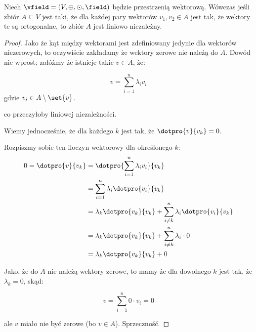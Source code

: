 \begin{theorem}
Niech \(\vfield = (V, \oplus, \odot, \field)\) będzie przestrzenią wektorową. Wówczas jeśli zbiór \( A \subseteq V\) jest taki, że dla każdej pary wektorów \(v_1, v_2 \in A\) jest tak, że wektory te są ortogonalne, to zbiór \(A\) jest liniowo niezależny.
\end{theorem}
\begin{proof} 
Jako że kąt między wektorami jest zdefiniowany jedynie dla wektorów niezerowych, to oczywiście zakładamy że wektory zerowe nie należą do \(A\).
Dowód nie wprost; załóżmy że istnieje takie \(v \in A\), że: 

\[ 
    v = \sum_{i=1}^{n} \lambda_i v_i
\]
gdzie \(v_i \in A \setminus \set{v}\).

co przeczyłoby liniowej niezależności.

Wiemy jednocześnie, że dla każdego \(k\) jest tak, że \(\dotpro{v}{v_k} = 0\). 

Rozpiszmy sobie ten iloczyn wektorowy dla określonego \(k\):
\begin{align*}
    0 = \dotpro{v}{v_k} &= \dotpro{\sum_{i=1}^{n} \lambda_i v_i}{v_k} \\ 
    &= \sum_{i=1}^{n} \lambda_i \dotpro{v_i}{v_k} \\ 
    &= \lambda_k \dotpro{v_k}{v_k} + \sum_{i \not = k}^{n} \lambda_i \dotpro{v_i}{v_k} \\ 
    &= \lambda_k \dotpro{v_k}{v_k} + \sum_{i \not = k}^{n} \lambda_i \cdot 0 \\ 
    &= \lambda_k \dotpro{v_k}{v_k} + 0 \\ 
\end{align*}

Jako, że do \(A\) nie należą wektory zerowe, to mamy że dla dowolnego \(k\) jest tak, że \(\lambda_k = 0\), skąd:

\[ 
    v = \sum_{i=1}^{n} 0 \cdot v_i = 0
\]

ale \(v\) miało nie być zerowe (bo \(v \in A\)). Sprzeczność.

\end{proof}